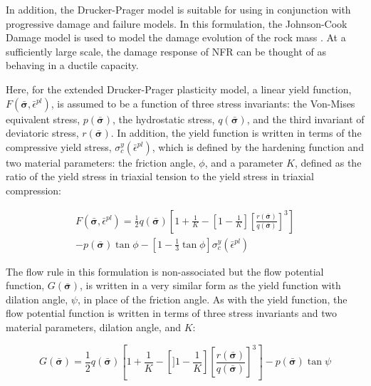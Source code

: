 In addition, the Drucker-Prager model is suitable for using in conjunction with progressive damage and failure models. In this formulation, the Johnson-Cook Damage model is used to model the damage evolution of the rock mass \citep{Johnson_1985}. At a sufficiently large scale, the damage response of NFR can be thought of as behaving in a ductile capacity. 

Here, for the extended Drucker-Prager plasticity model, a linear yield function, $F\left(\bar{\boldsymbol{\sigma}}, \bar{\epsilon}^{pl}\right)$, is assumed to be a function of three stress invariants: the Von-Mises equivalent stress, $p\left(\bar{\boldsymbol{\sigma}}\right)$, the hydrostatic stress, $q\left(\bar{\boldsymbol{\sigma}}\right)$, and the third invariant of deviatoric stress, $r\left(\bar{\boldsymbol{\sigma}}\right)$. In addition, the yield function is written in terms of the compressive yield stress, $\sigma_c^y\left(\bar{\epsilon}^{pl}\right)$, which is defined by the hardening function and two material parameters: the friction angle, $\phi$, and a parameter $K$, defined as the ratio of the yield stress in triaxial tension to the yield stress in triaxial compression:

\begin{multline}
F\left(\bar{\boldsymbol{\sigma}}, \bar{\epsilon}^{pl}\right)=
\frac{1}{2}q\left(\bar{\boldsymbol{\sigma}}\right)\left [ 1+\frac{1}{K}-\left [1-\frac{1}{K} \right ]\left [ \frac{r\left(\bar{\boldsymbol{\sigma}}\right)}{q\left(\bar{\boldsymbol{\sigma}}\right)} \right ]^3 \right ] \\
- p\left(\bar{\boldsymbol{\sigma}}\right)\tan\phi - \left[1-\frac{1}{3}\tan\phi \right]\sigma_c^y\left(\bar{\epsilon}^{pl}\right)
\label{eqn:druc1}
\end{multline}

The flow rule in this formulation is non-associated but the flow potential function, $G\left(\bar{\boldsymbol{\sigma}}\right)$, is written in a very similar form as the yield function with dilation angle, $\psi$, in place of the friction angle. As with the yield function, the flow potential function is written in terms of three stress invariants and two material parameters, dilation angle, and $K$:

\begin{equation}
G\left(\bar{\boldsymbol{\sigma}}\right)=
\frac{1}{2}q\left(\bar{\boldsymbol{\sigma}}\right)\left [ 1+\frac{1}{K}-\left [] 1-\frac{1}{K} \right ]\left [\frac{r\left(\bar{\boldsymbol{\sigma}}\right)}{q\left(\bar{\boldsymbol{\sigma}}\right)} \right ]^3 \right ] 
-p\left(\bar{\boldsymbol{\sigma}}\right)\tan\psi
\label{eqn:druc2}
\end{equation}

